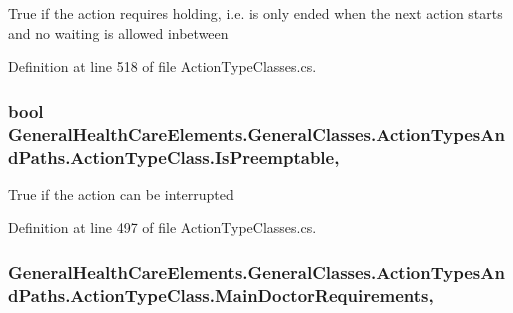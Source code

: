 True if the action requires holding, i.\+e. is only ended when the next action starts and no waiting is allowed inbetween 



Definition at line 518 of file Action\+Type\+Classes.\+cs.

\subsubsection[{\texorpdfstring{Is\+Preemptable}{IsPreemptable}}]{\setlength{\rightskip}{0pt plus 5cm}bool General\+Health\+Care\+Elements.\+General\+Classes.\+Action\+Types\+And\+Paths.\+Action\+Type\+Class.\+Is\+Preemptable\hspace{0.3cm}{\ttfamily [get]}, {\ttfamily [set]}}\hypertarget{class_general_health_care_elements_1_1_general_classes_1_1_action_types_and_paths_1_1_action_type_class_a400cc87b19f9b7c64aad2ac305469776}{}\label{class_general_health_care_elements_1_1_general_classes_1_1_action_types_and_paths_1_1_action_type_class_a400cc87b19f9b7c64aad2ac305469776}


True if the action can be interrupted 



Definition at line 497 of file Action\+Type\+Classes.\+cs.

\subsubsection[{\texorpdfstring{Main\+Doctor\+Requirements}{MainDoctorRequirements}}]{ General\+Health\+Care\+Elements.\+General\+Classes.\+Action\+Types\+And\+Paths.\+Action\+Type\+Class.\+Main\+Doctor\+Requirements\hspace{0.3cm}{\ttfamily [get]}, {\ttfamily [set]}}\hypertarget{class_general_health_care_elements_1_1_general_classes_1_1_action_types_and_paths_1_1_action_type_class_a8410a4f7863e52386b733b88de87df5c}{}\label{class_general_health_care_elements_1_1_general_classes_1_1_action_types_and_paths_1_1_action_type_class_a8410a4f7863e52386b733b88de87df5c}


